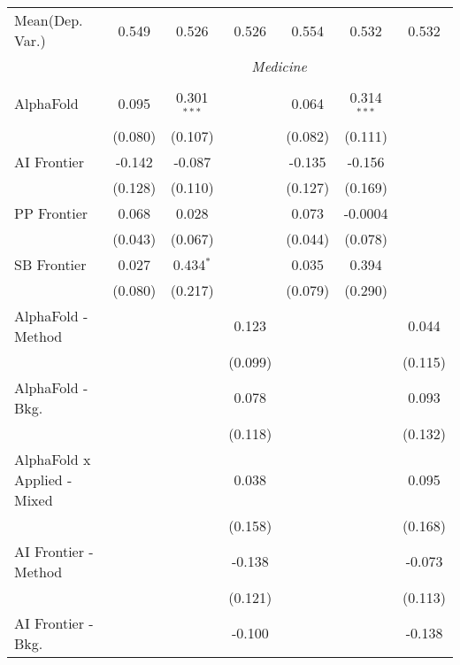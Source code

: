 \begin{tabular}{lcccccc}
Mean(Dep. Var.) & 0.549 & 0.526 & 0.526 & 0.554 & 0.532 & 0.532 \\
 & \multicolumn{6}{c}{\textit{Medicine}} \\ \\
   AlphaFold                   & 0.095   & 0.301$^{***}$ &         & 0.064   & 0.314$^{***}$ &   \\   
                               & (0.080) & (0.107)       &         & (0.082) & (0.111)       &   \\   
   AI Frontier                 & -0.142  & -0.087        &         & -0.135  & -0.156        &   \\   
                               & (0.128) & (0.110)       &         & (0.127) & (0.169)       &   \\   
   PP Frontier                 & 0.068   & 0.028         &         & 0.073   & -0.0004       &   \\   
                               & (0.043) & (0.067)       &         & (0.044) & (0.078)       &   \\   
   SB Frontier                 & 0.027   & 0.434$^{*}$   &         & 0.035   & 0.394         &   \\   
                               & (0.080) & (0.217)       &         & (0.079) & (0.290)       &   \\   
   AlphaFold - Method          &         &               & 0.123   &         &               & 0.044\\   
                               &         &               & (0.099) &         &               & (0.115)\\   
   AlphaFold - Bkg.            &         &               & 0.078   &         &               & 0.093\\   
                               &         &               & (0.118) &         &               & (0.132)\\   
   AlphaFold x Applied - Mixed &         &               & 0.038   &         &               & 0.095\\   
                               &         &               & (0.158) &         &               & (0.168)\\   
   AI Frontier - Method        &         &               & -0.138  &         &               & -0.073\\   
                               &         &               & (0.121) &         &               & (0.113)\\   
   AI Frontier - Bkg.          &         &               & -0.100  &         &               & -0.138\\   

\end{tabular}

